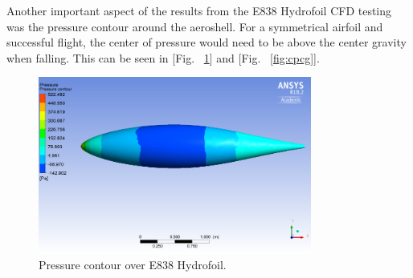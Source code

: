 \begin{table}[H]
\caption{\label{tab:cfdvelocity}Drag force and drag coefficient values from 0 – 25 seconds.}
\centering
{}
\end{table}

\indent\indent Another important aspect of the results from the E838 Hydrofoil CFD testing was the pressure contour around the aeroshell. For a symmetrical airfoil and successful flight, the center of pressure would need to be above the center gravity when falling. This can be seen in [Fig. ~\ref{fig:pressurecontour}] and [Fig. ~\ref{fig:cpcg}].

\begin{figure}[H]
  \centering
  \includegraphics[width=0.8\textwidth]{Aeroshell/Pressure_contour.png}
  \caption{\label{fig:pressurecontour}Pressure contour over E838 Hydrofoil.}
\end{figure}

